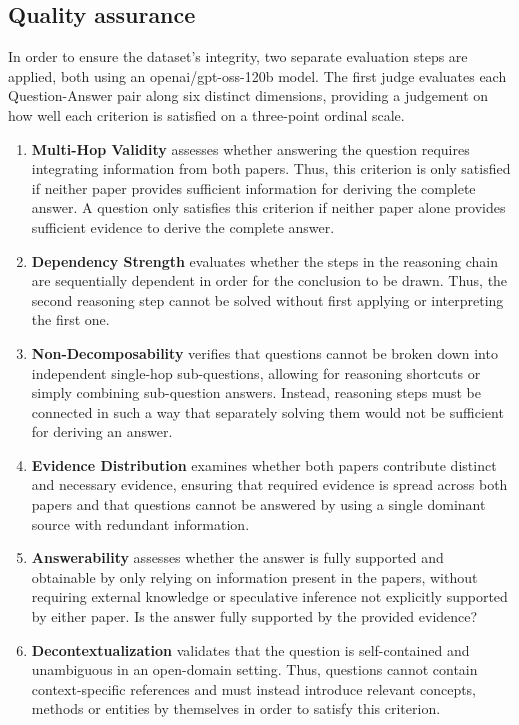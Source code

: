 \subsection{Quality assurance}
In order to ensure the dataset's integrity, two separate evaluation steps are applied, both using an openai/gpt-oss-120b \cite{gptoss120B} model.
The first judge evaluates each Question-Answer pair along six distinct dimensions, providing a judgement on how well each criterion is satisfied on a three-point ordinal scale.
\begin{enumerate}
      \item  \textbf{Multi-Hop Validity} assesses whether answering the question requires integrating information from both papers. Thus, this criterion is only satisfied if neither paper provides sufficient information for deriving the complete answer.
      A question only satisfies this criterion if neither paper alone provides sufficient evidence to derive the complete answer.
      \item  \textbf{Dependency Strength} evaluates whether the steps in the reasoning chain are sequentially dependent in order for the conclusion to be drawn. Thus, the second reasoning step cannot be solved without first applying or interpreting the first one.
      \item  \textbf{Non-Decomposability} verifies that questions cannot be broken down into independent single-hop sub-questions, allowing for reasoning shortcuts or simply combining sub-question answers. Instead, reasoning steps must be connected in such a way that separately solving them would not be sufficient for deriving an answer.
      \item  \textbf{Evidence Distribution} examines whether both papers contribute distinct and necessary evidence, ensuring that required evidence is spread across both papers and that questions cannot be answered by using a single dominant source with redundant information.
      \item  \textbf{Answerability} assesses whether the answer is fully supported and obtainable by only relying on information present in the papers, without requiring external knowledge or speculative inference not explicitly supported by either paper. 
      Is the answer fully supported by the provided evidence?
      \item  \textbf{Decontextualization} validates that the question is self-contained and unambiguous in an open-domain setting. Thus, questions cannot contain context-specific references and must instead introduce relevant concepts, methods or entities by themselves in order to satisfy this criterion.
\end{enumerate}

